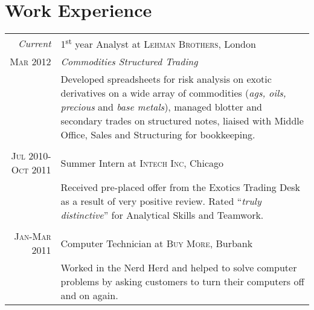 \section{Work Experience}

\begin{tabular}{r|p{11cm}}
\emph{Current} & 1\textsuperscript{st} year Analyst at \textsc{Lehman Brothers}, London \\
\textsc{Mar 2012} & \emph{Commodities Structured Trading}\\ 
& \footnotesize{Developed spreadsheets for risk analysis on exotic derivatives on a wide array of commodities (\textit{ags, oils, precious} and \textit{base metals}), managed blotter and secondary trades on structured notes, liaised with Middle Office, Sales and Structuring for bookkeeping.}\\
\multicolumn{2}{c}{} \\


\textsc{Jul 2010-Oct 2011} & Summer Intern at \textsc{Intech Inc}, Chicago \emph{}\\
& \footnotesize{Received pre-placed offer from the Exotics Trading Desk as a result of very positive review. Rated ``\emph{truly distinctive}'' for Analytical Skills and Teamwork.}\\
\multicolumn{2}{c}{} \\


\textsc{Jan-Mar 2011} & Computer Technician at \textsc{Buy More}, Burbank \emph{}\\
& \footnotesize{Worked in the Nerd Herd and helped to solve computer problems by asking customers to turn their computers off and on again.}
\end{tabular}